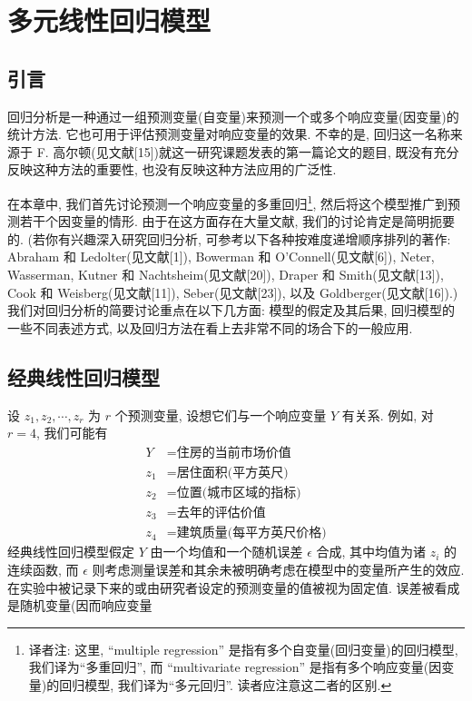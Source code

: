 
\chapter{多元线性回归模型}
\label{chap:7}

\section{引言}
\label{sec:7.1}

回归分析是一种通过一组预测变量(自变量)来预测一个或多个响应变量(因变量)的统计方法. 它也可用于评估预测变量对响应变量的效果. 不幸的是, 回归这一名称来源于 F. 高尔顿(见文献[15])就这一研究课题发表的第一篇论文的题目, 既没有充分反映这种方法的重要性, 也没有反映这种方法应用的广泛性.

在本章中, 我们首先讨论预测一个响应变量的多重回归\footnote{{\footnotesize 译者注: 这里, ``multiple regression'' 是指有多个自变量(回归变量)的回归模型, 我们译为``多重回归'', 而 ``multivariate regression'' 是指有多个响应变量(因变量)的回归模型, 我们译为``多元回归''. 读者应注意这二者的区别.}}, 然后将这个模型推广到预测若干个因变量的情形. 由于在这方面存在大量文献, 我们的讨论肯定是简明扼要的. (若你有兴趣深入研究回归分析, 可参考以下各种按难度递增顺序排列的著作: Abraham 和 Ledolter(见文献[1]), Bowerman 和 O'Connell(见文献[6]), Neter, Wasserman, Kutner 和 Nachtsheim(见文献[20]), Draper 和 Smith(见文献[13]), Cook 和 Weisberg(见文献[11]), Seber(见文献[23]), 以及 Goldberger(见文献[16]).) 我们对回归分析的简要讨论重点在以下几方面: 模型的假定及其后果, 回归模型的一些不同表述方式, 以及回归方法在看上去非常不同的场合下的一般应用.

\section{经典线性回归模型}
\label{sec:7.2}

设 $z_1,z_2,\cdots,z_r$ 为 $r$ 个预测变量, 设想它们与一个响应变量 $Y$ 有关系. 例如, 对 $r=4$, 我们可能有
\[
\begin{aligned}
Y &= \text{住房的当前市场价值}\\
z_1 &= \text{居住面积(平方英尺)}\\
z_2 &= \text{位置(城市区域的指标)}\\
z_3 &= \text{去年的评估价值}\\
z_4 &= \text{建筑质量(每平方英尺价格)}
\end{aligned}
\]
经典线性回归模型假定 $Y$ 由一个均值和一个随机误差 $\epsilon$ 合成, 其中均值为诸 $z_i$ 的连续函数, 而 $\epsilon$ 则考虑测量误差和其余未被明确考虑在模型中的变量所产生的效应. 在实验中被记录下来的或由研究者设定的预测变量的值被视为固定值. 误差被看成是随机变量(因而响应变量
